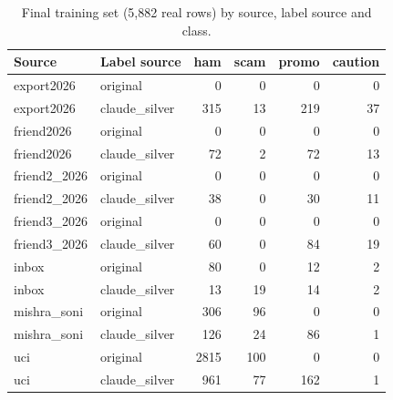\begin{table}[t]
\centering
\caption{Final training set (5,882 real rows) by source, label source and class.}
\label{tab:comp_train}
\small
\begin{tabular}{llrrrr}
\toprule
Source & Label source & ham & scam & promo & caution \\
\midrule
export2026 & original & 0 & 0 & 0 & 0 \\
export2026 & claude\_silver & 315 & 13 & 219 & 37 \\
friend2026 & original & 0 & 0 & 0 & 0 \\
friend2026 & claude\_silver & 72 & 2 & 72 & 13 \\
friend2\_2026 & original & 0 & 0 & 0 & 0 \\
friend2\_2026 & claude\_silver & 38 & 0 & 30 & 11 \\
friend3\_2026 & original & 0 & 0 & 0 & 0 \\
friend3\_2026 & claude\_silver & 60 & 0 & 84 & 19 \\
inbox & original & 80 & 0 & 12 & 2 \\
inbox & claude\_silver & 13 & 19 & 14 & 2 \\
mishra\_soni & original & 306 & 96 & 0 & 0 \\
mishra\_soni & claude\_silver & 126 & 24 & 86 & 1 \\
uci & original & 2815 & 100 & 0 & 0 \\
uci & claude\_silver & 961 & 77 & 162 & 1 \\
\bottomrule
\end{tabular}
\end{table}
